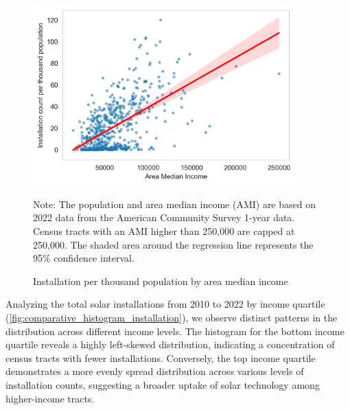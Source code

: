 \documentclass[11pt,twoside,letterpaper]{article}
\begin{document}
\begin{figure}[h]
    \centering
\includegraphics[width=0.9\textwidth]{figures/population_ami_count.png}
    \caption{Installation per thousand population by area median income}
    \label{fig:population_ami_count}
        \begin{flushleft}
        \footnotesize Note: The population and area median income (AMI) are based on 2022 data from the American Community Survey 1-year data. Census tracts with an AMI higher than 250,000 are capped at 250,000. The shaded area around the regression line represents the 95\% confidence interval.
    \end{flushleft}
\end{figure}

Analyzing the total solar installations from 2010 to 2022 by income quartile (\autoref{fig:comparative_histogram_installation}), we observe distinct patterns in the distribution across different income levels. The histogram for the bottom income quartile reveals a highly left-skewed distribution, indicating a concentration of census tracts with fewer installations. Conversely, the top income quartile demonstrates a more evenly spread distribution across various levels of installation counts, suggesting a broader uptake of solar technology among higher-income tracts.
\end{document}
